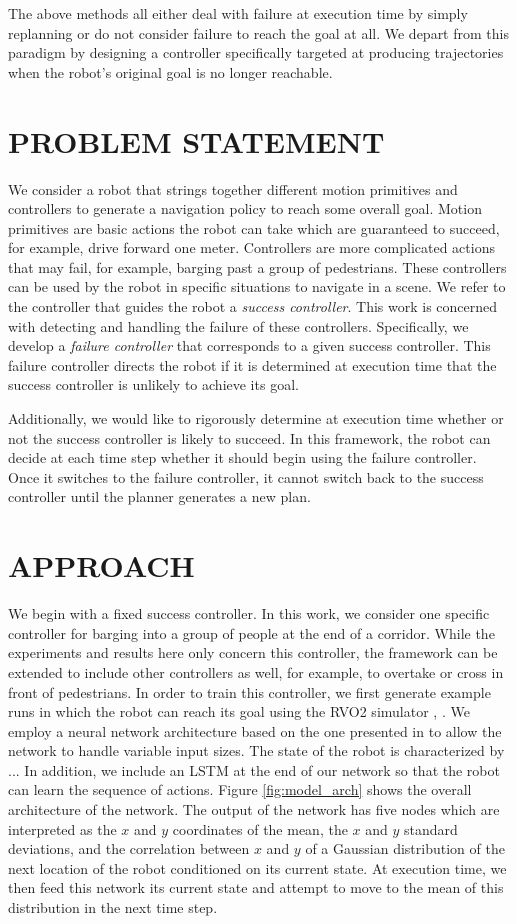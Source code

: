 \documentclass[letterpaper, 10 pt, conference]{ieeeconf}  %
\begin{document}
	The above methods all either deal with failure at execution time by simply replanning or do not consider failure to reach the goal at all. We depart from this paradigm by designing a controller specifically targeted at producing trajectories when the robot's original goal is no longer reachable.
	
\section{PROBLEM STATEMENT}
	We consider a robot that strings together different motion primitives and controllers to generate a navigation policy to reach some overall goal. Motion primitives are basic actions the robot can take which are guaranteed to succeed, for example, drive forward one meter. Controllers are more complicated actions that may fail, for example, barging past a group of pedestrians. These controllers can be used by the robot in specific situations to navigate in a scene. We refer to the controller that guides the robot a \textit{success controller}. This work is concerned with detecting and handling the failure of these controllers. Specifically, we develop a \textit{failure controller} that corresponds to a given success controller. This failure controller directs the robot if it is determined at execution time that the success controller is unlikely to achieve its goal. 
	
	Additionally, we would like to rigorously determine at execution time whether or not the success controller is likely to succeed. In this framework, the robot can decide at each time step whether it should begin using the failure controller. Once it switches to the failure controller, it cannot switch back to the success controller until the planner generates a new plan. 
		
\section{APPROACH}
	We begin with a fixed success controller. In this work, we consider one specific controller for barging into a group of people at the end of a corridor. While the experiments and results here only concern this controller, the framework can be extended to include other controllers as well, for example, to overtake or cross in front of pedestrians. In order to train this controller, we first generate example runs in which the robot can reach its goal using the RVO2 simulator \cite{rvo2}, \cite{pyrvo2}. We employ a neural network architecture based on the one presented in \cite{crowdawarerl} to allow the network to handle variable input sizes. The state of the robot is characterized by ... In addition, we include an LSTM at the end of our network so that the robot can learn the sequence of actions. Figure \ref{fig:model_arch} shows the overall architecture of the network. The output of the network has five nodes which are interpreted as the $x$ and $y$ coordinates of the mean, the $x$ and $y$ standard deviations, and the correlation between $x$ and $y$ of a Gaussian distribution of the next location of the robot conditioned on its current state. At execution time, we then feed this network its current state and attempt to move to the mean of this distribution in the next time step.
	
\end{document}
